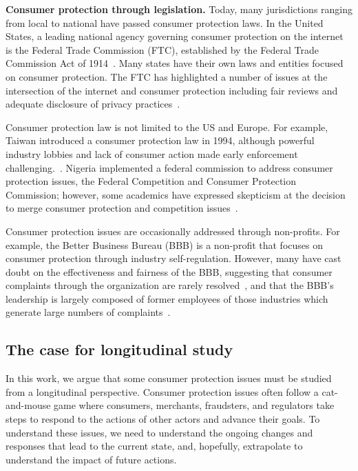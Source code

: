 \textbf{Consumer protection through legislation.}
Today, many jurisdictions ranging from local to national have passed consumer protection laws. In the United States, a leading national agency governing consumer protection on the internet is the Federal Trade Commission (FTC), established by the Federal Trade Commission Act of 1914~\cite{ftcact}. Many states have their own laws and entities focused on consumer protection. The FTC has highlighted a number of issues at the intersection of the internet and consumer protection including fair reviews and adequate disclosure of privacy practices~\cite{ftc20approves,ftc21notice,ftc2021disclosures,ftc-privacy-survey1998,ftc-privacy-survey2000,ftc2021canspam,ftc1997principles}.

Consumer protection law is not limited to the US and Europe. For example, Taiwan introduced a consumer protection law in 1994, although powerful industry lobbies and lack of consumer action made early enforcement challenging.~\cite{juang1997taiwan}. Nigeria implemented a federal commission to address consumer protection issues, the Federal Competition and Consumer Protection Commission; however, some academics have expressed skepticism at the decision to merge consumer protection and competition issues~\cite{tavuyanago2020interface}.

Consumer protection issues are occasionally addressed through non-profits. For example, the Better Business Bureau (BBB) is a non-profit that focuses on consumer protection through industry self-regulation. However, many have cast doubt on the effectiveness and fairness of the BBB, suggesting that consumer complaints through the organization are rarely resolved~\cite{fisher1999dissatisfied}, and that the BBB's leadership is largely composed of former employees of those industries which generate large numbers of complaints~\cite{garrett2007debate}.

\subsection{The case for longitudinal study}
In this work, we argue that some consumer protection issues must be studied from a longitudinal perspective. Consumer protection issues often follow a cat-and-mouse game where consumers, merchants, fraudsters, and regulators take steps to respond to the actions of other actors and advance their goals. To understand these issues, we need to understand the ongoing changes and responses that lead to the current state, and, hopefully, extrapolate to understand the impact of future actions.

